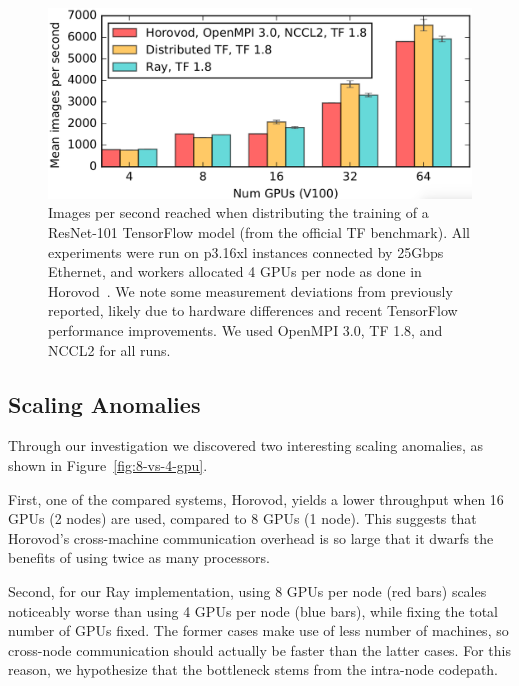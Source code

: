 \begin{figure}
    \centering
    \includegraphics[width=5.1in,keepaspectratio]{fig/sgd.png}
    \caption{
    \small{
        Images per second reached when distributing the training of a
        ResNet-101 TensorFlow model (from the official TF benchmark).
        All experiments were run on p3.16xl instances connected by 25Gbps Ethernet, and
        workers allocated 4 GPUs per node as done in Horovod~\cite{horovod}.
        We note some measurement deviations from previously reported, likely
        due to hardware differences and
        recent TensorFlow performance improvements. We used
        OpenMPI 3.0, TF 1.8, and NCCL2 for all runs.
    }
    }
    \label{fig:sgd}
\end{figure}

\subsection{Scaling Anomalies}
Through our investigation we discovered two interesting scaling anomalies, as
shown in Figure~\ref{fig:8-vs-4-gpu}.

First, one of the compared systems, Horovod, yields a lower throughput when 16
GPUs (2 nodes) are used, compared to 8 GPUs (1 node).  This suggests that
Horovod's cross-machine communication overhead is so large that it dwarfs the
benefits of using twice as many processors.

Second, for our Ray implementation, using 8 GPUs per node (red bars) scales
noticeably worse than using 4 GPUs per node (blue bars), while fixing the total
number of GPUs fixed.  The former cases make use of less number of machines, so
cross-node communication should actually be faster than the latter cases.  For
this reason, we hypothesize that the bottleneck stems from the intra-node
codepath.

